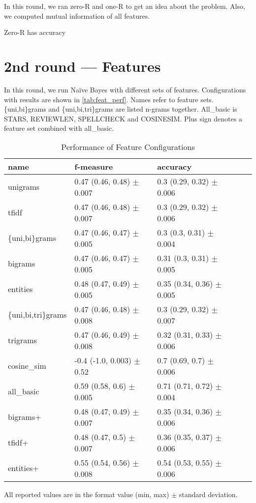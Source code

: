 In this round, we ran zero-R and one-R to get an idea about the problem.
Also, we computed mutual information of all features.

Zero-R has accuracy


\section{2nd round --- Features}

In this round, we run Na\"{i}ve Bayes with different sets of features.
Configurations with results are shown in \autoref{tab:feat_perf}.
Names refer to feature sets.
\{uni,bi\}grams and \{uni,bi,tri\}grams are listed n-grams together.
All\_basic is STARS, REVIEWLEN, SPELLCHECK and COSINESIM.
Plus sign denotes a feature set combined with all\_basic.

\begin{table}[h!]

\centering
\begin{tabular}{lllll}
\toprule
\textbf{name}	& \textbf{f-measure} & \textbf{accuracy} \\
\midrule
unigrams& 0.47 (0.46, 0.48) $\pm$ 0.007 & 0.3 (0.29, 0.32) $\pm$ 0.006 \\
tfidf& 0.47 (0.46, 0.48) $\pm$ 0.007 & 0.3 (0.29, 0.32) $\pm$ 0.006 \\
\{uni,bi\}grams	& 0.47 (0.46, 0.47) $\pm$ 0.005 & 0.3 (0.3, 0.31) $\pm$ 0.004\\
bigrams & 0.47 (0.46, 0.47) $\pm$ 0.005 & 0.31 (0.3, 0.31) $\pm$ 0.005			\\
entities & 0.48 (0.47, 0.49) $\pm$ 0.005 & 0.35 (0.34, 0.36) $\pm$ 0.005		\\
\{uni,bi,tri\}grams & 0.47 (0.46, 0.48) $\pm$ 0.008 & 0.3 (0.29, 0.32) $\pm$ 0.007	\\
trigrams & 0.47 (0.46, 0.49) $\pm$ 0.008 & 0.32 (0.31, 0.33) $\pm$ 0.006		\\
cosine\_sim & -0.4 (-1.0, 0.003) $\pm$ 0.52 & 0.7 (0.69, 0.7) $\pm$ 0.006		\\
all\_basic & 0.59 (0.58, 0.6) $\pm$ 0.005 & 0.71 (0.71, 0.72) $\pm$ 0.004		\\
bigrams+ & 0.48 (0.47, 0.49) $\pm$ 0.007 & 0.35 (0.34, 0.36) $\pm$ 0.006		\\
tfidf+ & 0.48 (0.47, 0.5) $\pm$ 0.007 & 0.36 (0.35, 0.37) $\pm$ 0.006			\\
entities+ & 0.55 (0.54, 0.56) $\pm$ 0.008 & 0.54 (0.53, 0.55) $\pm$ 0.006		\\
\bottomrule
\end{tabular}






\caption{Performance of Feature Configurations}\label{tab:feat_perf}
All reported values are in the format value (min, max) $\pm$ standard deviation.
\end{table}


